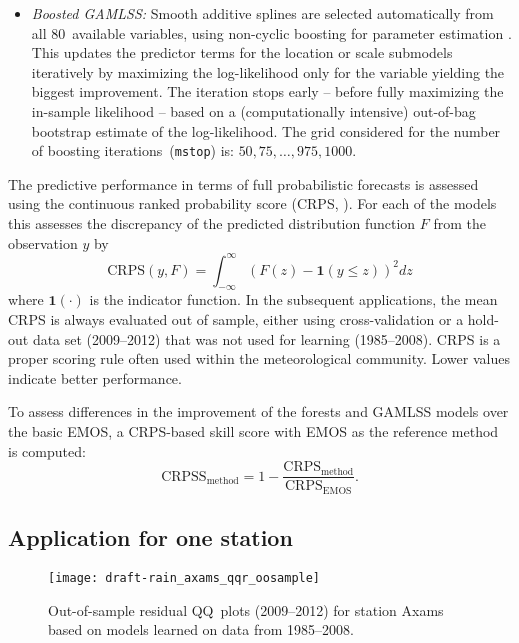 \documentclass[aoas, preprint]{imsart}
\numberwithin{equation}{subsection}
\begin{document}
\begin{itemize}
\item \emph{Boosted GAMLSS:} Smooth additive splines are selected
  automatically from all 80~available variables, using non-cyclic boosting
  for parameter estimation \citep{Hofner+Mayr+Schmid:2016,Messner+Mayr+Zeileis:2017}.
  This updates the predictor terms for the location or scale submodels iteratively
  by maximizing the log-likelihood only for the variable yielding the
  biggest improvement. The iteration stops early -- before fully maximizing
  the in-sample likelihood -- based on a (computationally intensive)
  out-of-bag bootstrap estimate of the log-likelihood. The grid considered for
  the number of boosting iterations~(\texttt{mstop}) is: $50, 75, \dots, 975, 1000$.

\end{itemize}

The predictive performance in terms of full probabilistic forecasts is
assessed using the continuous ranked probability score (CRPS, \citealp{Hersbach:2000}).
For each of the models this assesses the discrepancy of the
predicted distribution function $F$ from the observation $y$ by
\begin{equation}
\text{CRPS}(y, F) = \int_{-\infty}^\infty (F(z) - \mathbf{1}(y \leq z))^2 dz
\end{equation}
where \(\mathbf{1}(\cdot)\) is the indicator function. In the subsequent
applications, the mean CRPS is always evaluated out of sample, 
either using cross-validation or a hold-out data set (2009--2012)
that was not used for learning (1985--2008). CRPS is a proper scoring rule
\citep{Gneiting+Raftery:2007} often used within the meteorological community.
Lower values indicate better performance.

To assess differences in the improvement of the forests and GAMLSS
models over the basic EMOS, a CRPS-based skill score with EMOS as
the reference method is computed:
\begin{equation}
\text{CRPSS}_{\text{method}} = 1 - \frac{\text{CRPS}_{\text{method}}}{\text{CRPS}_{\text{EMOS}}}.
\end{equation}




\subsection{Application for one station}
\label{sec:axams}

\begin{figure}[t!]
\centering
{}
\texttt{[image: draft-rain\_axams\_qqr\_oosample]}
\caption{\label{fig:axams-qq} Out-of-sample residual QQ~plots (2009--2012) 
for station Axams based on models learned on data from 1985--2008.}
\end{figure}
\end{document}
